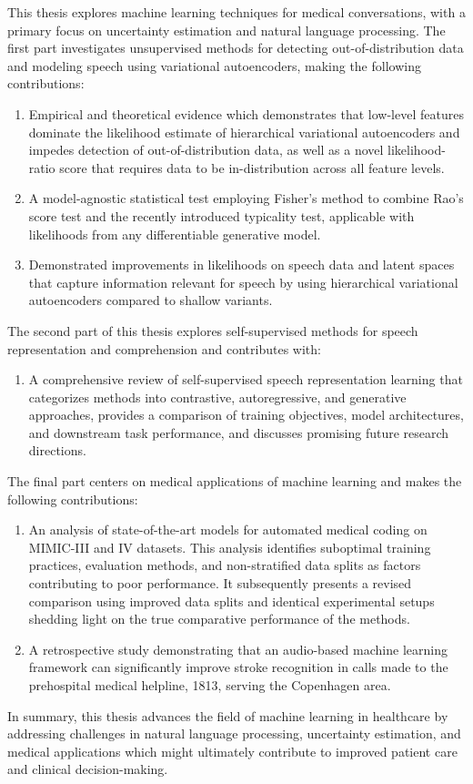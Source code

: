 This thesis explores machine learning techniques for medical conversations, with a primary focus on uncertainty estimation and natural language processing. The first part investigates unsupervised methods for detecting out-of-distribution data and modeling speech using variational autoencoders, making the following contributions:
%
\begin{enumerate}[label=(\roman*)] 
    \item Empirical and theoretical evidence which demonstrates that low-level features dominate the likelihood estimate of hierarchical variational autoencoders and impedes detection of out-of-distribution data, as well as a novel likelihood-ratio score that requires data to be in-distribution across all feature levels.
    \item A model-agnostic statistical test employing Fisher's method to combine Rao's score test and the recently introduced typicality test, applicable with likelihoods from any differentiable generative model.
    \item Demonstrated improvements in likelihoods on speech data and latent spaces that capture information relevant for speech by using hierarchical variational autoencoders compared to shallow variants.
\end{enumerate}
%
The second part of this thesis explores self-supervised methods for speech representation and comprehension and contributes with:
%
\begin{enumerate}[resume, label=(\roman*)] 
    \item A comprehensive review of self-supervised speech representation learning that categorizes methods into contrastive, autoregressive, and generative approaches, provides a comparison of training objectives, model architectures, and downstream task performance, and discusses promising future research directions.
\end{enumerate}
%
The final part centers on medical applications of machine learning and makes the following contributions:
%
\begin{enumerate}[resume, label=(\roman*)] 
    \item An analysis of state-of-the-art models for automated medical coding on MIMIC-III and IV datasets. This analysis identifies suboptimal training practices, evaluation methods, and non-stratified data splits as factors contributing to poor performance. It subsequently presents a revised comparison using improved data splits and identical experimental setups shedding light on the true comparative performance of the methods.
    \item A retrospective study demonstrating that an audio-based machine learning framework can significantly improve stroke recognition in calls made to the prehospital medical helpline, 1813, serving the Copenhagen area.
\end{enumerate}
%
In summary, this thesis advances the field of machine learning in healthcare by addressing challenges in natural language processing, uncertainty estimation, and medical applications which might ultimately contribute to improved patient care and clinical decision-making.
